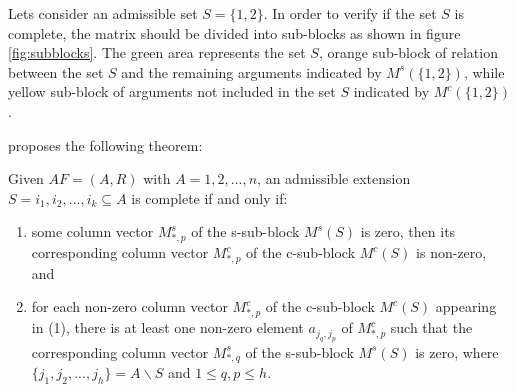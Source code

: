 Lets consider an admissible set $S = \{1,2\}$. In order to verify if the set $S$ is complete, the matrix should be divided into sub-blocks as shown in figure \ref{fig:subblocks}. The green area represents the set $S$, orange sub-block of relation between the set $S$ and the remaining arguments indicated by $M^s(\{1,2\})$, while yellow sub-block of arguments not included in the set $S$ indicated by $M^c(\{1,2\})$. 

\citep{xu2015matrix} proposes the following theorem:
\begin{theorem}
Given $AF = (A, R)$ with $A = {1, 2, ..., n}$, an admissible extension $S = {i_1, i_2, ..., i_k} \subseteq A$ is complete if and only if:
\begin{enumerate}\label{theorem:completeMatrix}
	\item some column vector $M^s_{*,p}$ of the s-sub-block $M^s(S)$ is zero, then its corresponding column vector $M^c_{*,p}$ of the c-sub-block $M^c(S)$ is non-zero, and
	\item for each non-zero column vector $M^c_{*,p}$ of the c-sub-block $M^c(S)$ appearing in (1), there is at least one non-zero element $a_{j_q,j_p}$ of $M^c_{*,p}$ such that the corresponding column vector $M^s_{*,q}$ of the s-sub-block $M^s(S)$ is zero, where $\{j_1,j_2,...,j_h\} = A\backslash S$ and $1\leq q,p \leq h$.
\end{enumerate}
\end{theorem}


